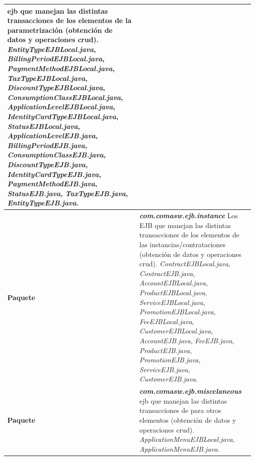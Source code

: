 \begin{longtable}{m{1cm} m{11cm}}
     \acrshort{ejb} que manejan las distintas transacciones de los elementos de la parametrización (obtención de datos y operaciones \acrshort{crud}).\newline
\textit{EntityTypeEJBLocal.java},
\textit{BillingPeriodEJBLocal.java},
\textit{PaymentMethodEJBLocal.java},
\textit{TaxTypeEJBLocal.java},
\textit{DiscountTypeEJBLocal.java},
\textit{ConsumptionClassEJBLocal.java},
\textit{ApplicationLevelEJBLocal.java},
\textit{IdentityCardTypeEJBLocal.java},
\textit{StatusEJBLocal.java},
\textit{ApplicationLevelEJB.java},
\textit{BillingPeriodEJB.java},
\textit{ConsumptionClassEJB.java},
\textit{DiscountTypeEJB.java},
\textit{IdentityCardTypeEJB.java},
\textit{PaymentMethodEJB.java},
\textit{StatusEJB.java},
\textit{TaxTypeEJB.java},
\textit{EntityTypeEJB.java}.
	\\\hline

	\textbf{Paquete} & \textit{\textbf{com.comasw.ejb.instance}} \newline
    Los EJB que manejan las distintas transacciones de los elementos de las instancias/contrataciones (obtención de datos y operaciones \acrshort{crud}). \newline
\textit{ContractEJBLocal.java},
\textit{ContractEJB.java},
\textit{AccountEJBLocal.java},
\textit{ProductEJBLocal.java},
\textit{ServiceEJBLocal.java},
\textit{PromotionEJBLocal.java},
\textit{FeeEJBLocal.java},
\textit{CustomerEJBLocal.java},
\textit{AccountEJB.java},
\textit{FeeEJB.java},
\textit{ProductEJB.java},
\textit{PromotionEJB.java},
\textit{ServiceEJB.java},
\textit{CustomerEJB.java}.
	\\\hline

	\textbf{Paquete} & \textit{\textbf{com.comasw.ejb.miscelaneous}} \newline
     \acrshort{ejb} que manejan las distintas transacciones de para otros elementos (obtención de datos y operaciones \acrshort{crud}).\newline
\textit{ApplicationMenuEJBLocal.java},
\textit{ApplicationMenuEJB.java}.
	\\\hline


\end{longtable}
